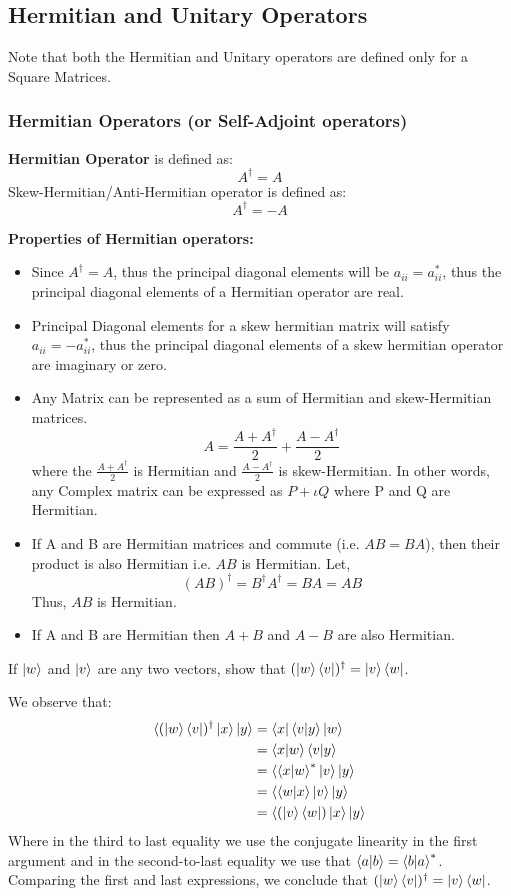 \subsection{Hermitian and Unitary Operators}
Note that both the Hermitian and Unitary operators are defined only for a Square Matrices.

\subsubsection{Hermitian Operators (or Self-Adjoint operators)}
\begin{definition}
\textbf{Hermitian Operator} is defined as:
\[A^{\dagger}=A\]
Skew-Hermitian/Anti-Hermitian operator is defined as:
\[A^{\dagger}=-A\]
\end{definition}

\textbf{Properties of Hermitian operators: }
\begin{itemize}
    \item Since $A^{\dagger}=A$, thus the principal diagonal elements will be $a_{ii}=a_{ii}^*$, thus the principal diagonal elements of a Hermitian operator are real.
    \item Principal Diagonal elements for a skew hermitian matrix will satisfy $a_{ii}=-a_{ii}^*$, thus the principal diagonal elements of a skew hermitian operator are imaginary or zero.
    \item Any Matrix can be represented as a sum of Hermitian and skew-Hermitian matrices.
    \[ A = \frac{A+A^{\dagger}}{2} + \frac{A-A^{\dagger}}{2} \] 
    where the $\frac{A + A^{\dagger}}{2}$ is Hermitian and $\frac{A-A^{\dagger}}{2}$ is skew-Hermitian. In other words, any Complex matrix can be expressed as $P+ \iota Q$ where P and Q are Hermitian.
    \item If A and B are Hermitian matrices and commute (i.e. $AB=BA$), then their product is also Hermitian i.e. $AB$ is Hermitian.
    Let,
    \[ (AB)^{\dagger}=B^{\dagger}A^{\dagger}=BA=AB \]
    Thus, $AB$ is Hermitian.
    \item If A and B are Hermitian then $A+B$ and $A-B$ are also Hermitian.
\end{itemize}
\begin{example}
    If $\ket{w}$ and $\ket{v}$ are any two vectors, show that $(\ket{w}\bra{v})^{\dagger}=\ket{v}\bra{w}$.

    We observe that:
    \begin{align*}
\braket{(\ket{w}\bra{v})^{\dagger}\ket{x}|y}&=\braket{x|\braket{v|y}|w}\\
        &=\braket{x|w}\braket{v|y}\\
        &=\braket{\braket{x|w}^{*}\ket{v}|y}\\
        &=\braket{\braket{w|x}\ket{v}|y}\\
        &=\braket{(\ket{v}\bra{w})\ket{x}|y}
    \end{align*}
    Where in the third to last equality we use the conjugate linearity in the first argument and in the second-to-last equality we use that $\braket{a|b}=\braket{b|a}^*$. Comparing the first and last expressions, we conclude that $(\ket{w}\bra{v})^{\dagger}=\ket{v}\bra{w}$.
\end{example}
